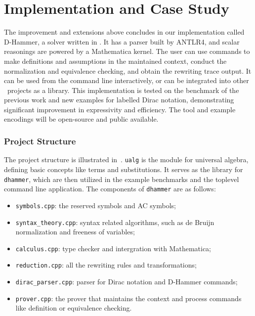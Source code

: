 
\section{Implementation and Case Study}
The improvement and extensions above concludes in our implementation called D-Hammer, a solver written in \CC. It has a parser built by ANTLR4, and scalar reasonings are powered by a Mathematica kernel. The user can use commands to make definitions and assumptions in the maintained context, conduct the normalization and equivalence checking, and obtain the rewriting trace output. 
It can be used from the command line interactively, or can be integrated into other \CC\ projects as a library.
This implementation is tested on the benchmark of the previous work and new examples for labelled Dirac notation, demonstrating significant improvement in expressivity and efficiency. 
The tool and example encodings will be open-source and public available.

\subsubsection{Project Structure}
The project structure is illustrated in~.
\texttt{ualg} is the module for universal algebra, defining basic concepts like terms and substitutions. It serves as the library for \texttt{dhammer}, which are then utilized in the example benchmarks and the toplevel command line application. The components of \texttt{dhammer} are as follows:
\begin{itemize}
    \item \texttt{symbols.cpp}: the reserved symbols and AC symbols;
    \item \texttt{syntax\_theory.cpp}: syntax related algorithms, such as de Bruijn normalization and freeness of variables;
    \item \texttt{calculus.cpp}: type checker and intergration with Mathematica;
    \item \texttt{reduction.cpp}: all the rewriting rules and transformations;
    \item \texttt{dirac\_parser.cpp}: parser for Dirac notation and D-Hammer commands;
    \item \texttt{prover.cpp}: the prover that maintains the context and process commands like definition or equivalence checking.
\end{itemize}




